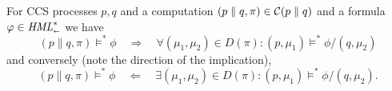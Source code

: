 \begin{theorem}\label{thm:decomposition}
    For CCS processes $p,q$ and a computation $(p \parallel q, \pi)\in \mathcal{C}(p\parallel q)$
    and a formula $\varphi \in \textit{HML}_\shortleftarrow^*$ we have
    \begin{equation}\label{eq:decomp_ltr}
        (p\parallel q, \pi) \vDash^* \phi  \quad\Rightarrow\quad
        \forall (\mu_1,\mu_2) \in D(\pi) : (p, \mu_1) \vDash^* \phi/(q, \mu_2)
    \end{equation}
    and conversely (note the direction of the implication),
    \begin{equation}\label{eq:decomp_rtl}
        (p\parallel q, \pi) \vDash^* \phi
        \quad\Leftarrow\quad
        \exists (\mu_1,\mu_2) \in D(\pi) : (p, \mu_1) \vDash^* \phi/(q, \mu_2).
    \end{equation}
\end{theorem}
